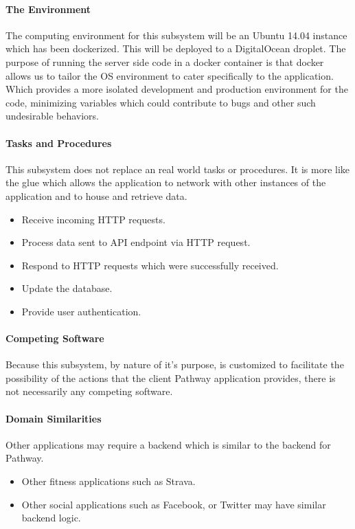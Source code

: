 \documentclass{article}
\begin{document}
\paragraph{The Environment}
The computing environment for this subsystem will be an Ubuntu 14.04 instance which has been dockerized. This will be deployed to a DigitalOcean droplet. The purpose of running the server side code in a docker container is that docker allows us to tailor the OS environment
to cater specifically to the application. Which provides a more isolated development and production environment for the code, minimizing variables which could contribute to bugs and other such undesirable behaviors.

\paragraph{Tasks and Procedures}
This subsystem does not replace an real world tasks or procedures. It is more like the glue which allows the application to
network with other instances of the application and to house and retrieve data.
\begin{itemize}
    \item Receive incoming HTTP requests.
    \item Process data sent to API endpoint via HTTP request.
    \item Respond to HTTP requests which were successfully received.
    \item Update the database.
    \item Provide user authentication.
\end{itemize}

\paragraph{Competing Software}
Because this subsystem, by nature of it's purpose, is customized to facilitate the possibility of the actions that the client Pathway
application provides, there is not necessarily any competing software.

\paragraph{Domain Similarities}
Other applications may require a backend which is similar to the backend for Pathway.
\begin{itemize}
    \item Other fitness applications such as Strava.
    \item Other social applications such as Facebook, or Twitter may have similar backend logic.
\end{itemize}
\end{document}
